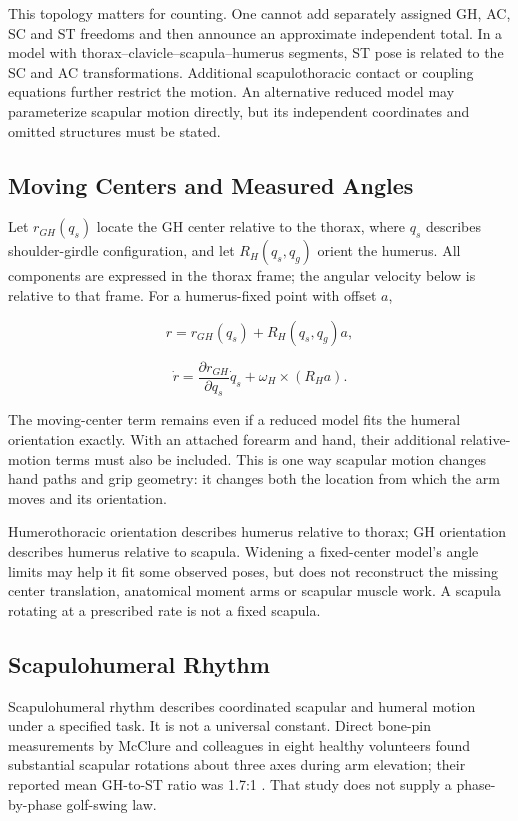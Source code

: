 This topology matters for counting. One cannot add separately assigned GH, AC, SC and ST freedoms and then announce an approximate independent total. In a model with thorax--clavicle--scapula--humerus segments, ST pose is related to the SC and AC transformations. Additional scapulothoracic contact or coupling equations further restrict the motion. An alternative reduced model may parameterize scapular motion directly, but its independent coordinates and omitted structures must be stated.

\subsection{Moving Centers and Measured Angles}\label{moving-centers-and-measured-angles}

Let \(r_{GH}(q_s)\) locate the GH center relative to the thorax, where \(q_s\) describes shoulder-girdle configuration, and let \(R_H(q_s,q_g)\) orient the humerus. All components are expressed in the thorax frame; the angular velocity below is relative to that frame. For a humerus-fixed point with offset \(a\),

\[
r=r_{GH}(q_s)+R_H(q_s,q_g)a,
\]

\[
\dot r=\frac{\partial r_{GH}}{\partial q_s}\dot q_s
+\omega_H\times(R_Ha).
\]

The moving-center term remains even if a reduced model fits the humeral orientation exactly. With an attached forearm and hand, their additional relative-motion terms must also be included. This is one way scapular motion changes hand paths and grip geometry: it changes both the location from which the arm moves and its orientation.

Humerothoracic orientation describes humerus relative to thorax; GH orientation describes humerus relative to scapula. Widening a fixed-center model's angle limits may help it fit some observed poses, but does not reconstruct the missing center translation, anatomical moment arms or scapular muscle work. A scapula rotating at a prescribed rate is not a fixed scapula.

\subsection{Scapulohumeral Rhythm}\label{scapulohumeral-rhythm}

Scapulohumeral rhythm describes coordinated scapular and humeral motion under a specified task. It is not a universal constant. Direct bone-pin measurements by McClure and colleagues in eight healthy volunteers found substantial scapular rotations about three axes during arm elevation; their reported mean GH-to-ST ratio was 1.7:1 \citep{McClure2001Scapula}. That study does not supply a phase-by-phase golf-swing law.

